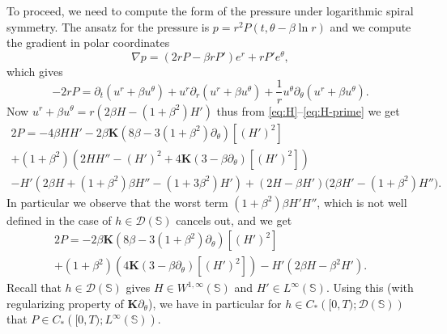 \documentclass[10pt]{amsart}
\theoremstyle{plain}
\theoremstyle{definition}
\let\rd\partial
\let\nb\nabla
\let\bt\beta
\let\tht\theta
\newcommand{\bfK}{{\mathbf K}}
\newcommand{\bbS}{\mathbb S}
\newcommand{\calD}{\mathcal D}
\begin{document}
To proceed, we need to compute the form of the pressure under logarithmic spiral symmetry. The ansatz for the pressure is $p= r^2 P(t,\tht-\bt\ln r)$ and we compute the gradient in polar coordinates
\begin{equation*}
\nb p = (2rP-\beta r P') e^{r} + r P' e^{\tht},
\end{equation*}
which gives
\[
-2rP=\partial_t \left(u^r+\beta u^\theta\right)+u^r\partial_r\left(u^r+\beta u^\theta\right)+\frac{1}{r}u^\theta \partial_\theta(u^r+\beta u^\theta).
\]
Now $u^r+\beta u^\theta=r\left(2\beta H-(1+\beta^2) H' \right)$ thus from \eqref{eq:H}--\eqref{eq:H-prime} we get
\begin{multline*}
2P=-4\beta H H' -2\beta\bfK(8\bt - 3(1+\bt^2)\rd_\tht)\left[ (H')^2 \right]\\
+(1+\beta^2)\left(2H H''- (H')^2 + 4 \bfK (3-\bt\rd_\tht)\left[ (H')^2 \right]\right)\\
-H' \left(2\beta H+(1+\beta^2)\beta H'' -(1+3\beta^2)H' \right)+\left(2H-\beta H' \right)\bigl(2\beta H' -\left(1+\beta^2\right) H''\bigr).
\end{multline*}
In particular we observe that the worst term $(1+\beta^2)\beta H' H''$, which is not well defined in the case of $h\in \mathcal{D}\left(\mathbb{S}\right)$ cancels out, and we get
\begin{multline*}
2P=-2\beta\bfK(8\bt - 3(1+\bt^2)\rd_\tht)\left[ (H')^2 \right]\\
+(1+\beta^2)\left(4 \bfK (3-\bt\rd_\tht)\left[ (H')^2 \right]\right)
- H'(2\beta H-\beta^2 H').
\end{multline*}
Recall that $h \in \calD(\bbS)$ gives $H \in W^{1,\infty}(\bbS)$ and $H' \in L^\infty(\bbS)$. Using this (with regularizing property of $\bfK \rd_\tht$), we have in particular for $h\in C_*\left([0,T);\mathcal{D}\left(\mathbb{S}\right)\right)$ that $P\in C_*\left([0,T);L^\infty\left(\mathbb{S}\right)\right)$.
\end{document}
